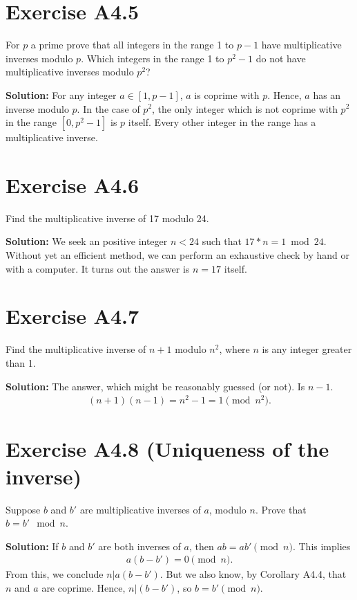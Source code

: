 \documentclass{book}
\begin{document}
\section*{Exercise A4.5}
    For $p$ a prime prove that all integers in the range 1 to $p-1$ have multiplicative inverses modulo $p$. Which integers in the range 1 to $p^2-1$ do not have multiplicative inverses modulo $p^2$?
    
    \textbf{Solution:} For any integer $a\in [1,p-1]$, $a$ is coprime with $p$. Hence, $a$ has an inverse modulo $p$. In the case of $p^2$, the only integer which is not coprime with $p^2$ in the range $[0,p^2-1]$ is $p$ itself. Every other integer in the range has a multiplicative inverse. 

\section*{Exercise A4.6}
    Find the multiplicative inverse of 17 modulo 24.
    
    \textbf{Solution:} We seek an positive integer $n<24$ such that $17 * n = 1 \bmod 24$. Without yet an efficient method, we can perform an exhaustive check by hand or with a computer. It turns out the answer is $n=17$ itself. 

\section*{Exercise A4.7}
    Find the multiplicative inverse of $n+1$ modulo $n^2$, where $n$ is any integer greater than 1.
    
    \textbf{Solution:} The answer, which might be reasonably guessed (or not). Is $n-1$.
    \begin{align}
        (n+1)(n-1) = n^2 - 1 = 1 \pmod n^2.
    \end{align}

\section*{Exercise A4.8 (Uniqueness of the inverse)}
    Suppose $b$ and $b'$ are multiplicative inverses of $a$, modulo $n$. Prove that $b=b' \mod n$.
    
    \textbf{Solution:} If $b$ and $b'$ are both inverses of $a$, then $ab = ab' \pmod n$. This implies
    \begin{align}
        a(b-b') = 0 \pmod n.
    \end{align}
    From this, we conclude $n|a(b-b')$. But we also know, by Corollary A4.4, that $n$ and $a$ are coprime. Hence, $n|(b-b')$, so $b=b' \pmod{n}$.
\end{document}

